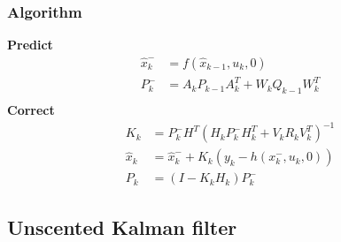 \subsubsection{Algorithm}
\textbf{Predict}
\begin{equation}
\begin{split}
\hat{x}_k^- &= f(\hat{x}_{k-1},u_k,0)\\
P_k^- &= A_kP_{k-1}A_k^T + W_kQ_{k-1}W_k^T\\
\end{split}
\end{equation}
\textbf{Correct}\\
\begin{equation}
\begin{split}
K_k &= P_k^-H^T(H_kP_k^-H_k^T + V_kR_kV_k^T)^{-1}\\
\hat{x}_k &= \hat{x}_k^- + K_k(y_k-h(x_k^-,u_k,0))\\
P_k &= (I- K_kH_k)P_k^-
\end{split}
\end{equation}
\subsection{Unscented Kalman filter}